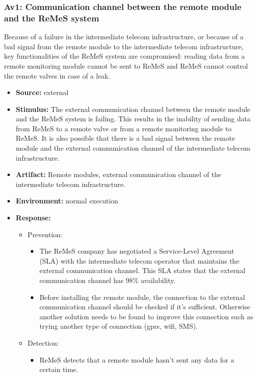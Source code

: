 \subsubsection{Av1: Communication channel between the remote module and the ReMeS system}
Because of a failure in the intermediate telecom infrastructure, or because
of a bad signal from the remote module to the intermediate telecom infrastructure,
key functionalities of the ReMeS system are compromised: reading data from a
remote monitoring module cannot be sent to ReMeS and ReMeS cannot control
the remote valves in case of a leak.
\begin{itemize}
	\item \textbf{Source:} external
	\item \textbf{Stimulus:} The external communication channel between the remote
								module and the ReMeS system is failing. This results in
								the inability of sending data from ReMeS to a remote 
								valve or from a remote monitoring module to ReMeS. It is also
								possible that there is a bad signal between the remote module
								and the external communication channel of the intermediate
								telecom infrastructure.
	\item \textbf{Artifact:} Remote modules, external communication channel of the intermediate telecom infrastructure.
	\item \textbf{Environment:} normal execution
	\item \textbf{Response:} 
		\begin{itemize}
			\item Prevention:
				\begin{itemize}
					\item The ReMeS company has negotiated a Service-Level Agreement (SLA) with the intermediate telecom operator that maintains the 
							external communication channel. This SLA states that the external communication channel has 98\% availability. 
					\item Before installing the remote module, the connection to the external communication
							channel should be checked if it's sufficient. Otherwise another solution needs to be found to improve this connection such
							as trying another type of connection (gprs, wifi, SMS).
				\end{itemize}
			\item Detection:
				\begin{itemize}
					\item ReMeS detects that a remote module hasn't sent any data for a certain time.

\end{itemize}
\end{itemize}
\end{itemize}
